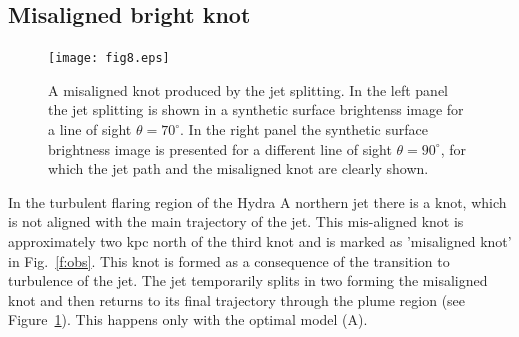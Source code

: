 %
%
\subsection{Misaligned bright knot}
\begin{figure}
\centering
\texttt{[image: fig8.eps]}
\caption{A misaligned knot produced by the jet splitting. In the left panel the jet splitting is shown in a synthetic surface brightenss image for a line of sight $\theta = 70^{\circ}$. In the right panel the synthetic surface brightness image is presented for a different line of sight $\theta = 90^{\circ}$, for which the jet path and the misaligned knot are clearly shown. }
\label{f:mknt}
\end{figure}

In the turbulent flaring region of the Hydra A northern jet there is a  knot, which is not aligned with the main trajectory of the jet. This mis-aligned knot is approximately two kpc north of the third knot and is marked as 'misaligned knot' in Fig.~\ref{f:obs}. This knot is formed as a consequence of the transition to turbulence of the jet. The jet temporarily splits in two forming the misaligned knot and then returns to its final trajectory through the plume region (see Figure~\ref{f:mknt}). This happens only with the optimal model (A).

